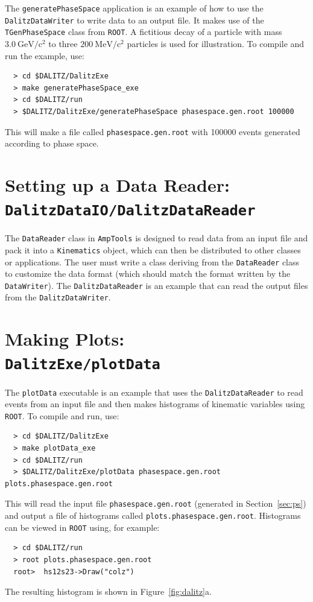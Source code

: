 \documentclass[11pt]{article}
\newcommand{\gevcc}{\mathrm{GeV/c^2}}
\newcommand{\mevcc}{\mathrm{MeV/c^2}}
\begin{document}
The {\tt generatePhaseSpace} application is an example of how to use the {\tt DalitzDataWriter} to write data to an output file.  It makes use of the {\tt TGenPhaseSpace} class from {\tt ROOT}.  A fictitious decay of a particle with mass $3.0~\gevcc$ to three $200~\mevcc$ particles is used for illustration.  To compile and run the example, use:
\begin{verbatim}
  > cd $DALITZ/DalitzExe
  > make generatePhaseSpace_exe
  > cd $DALITZ/run
  > $DALITZ/DalitzExe/generatePhaseSpace phasespace.gen.root 100000
\end{verbatim}
This will make a file called {\tt phasespace.gen.root} with 100000 events generated according to phase space.

\section{Setting up a Data Reader: \\
{\tt DalitzDataIO/DalitzDataReader}}
\label{sec:dr}

The {\tt DataReader} class in {\tt AmpTools} is designed to read data from an input file and pack it into a {\tt Kinematics} object, which can then be distributed to other classes or applications.  The user must write a class deriving from the {\tt DataReader} class to customize the data format (which should match the format written by the {\tt DataWriter}).  The {\tt DalitzDataReader} is an example that can read the output files from the {\tt DalitzDataWriter}.

\section{Making Plots: \\
{\tt DalitzExe/plotData}}
\label{sec:plot}

The {\tt plotData} executable is an example that uses the {\tt DalitzDataReader} to read events from an input file and then makes histograms of kinematic variables using {\tt ROOT}.  To compile and run, use:
\begin{verbatim}
  > cd $DALITZ/DalitzExe
  > make plotData_exe
  > cd $DALITZ/run
  > $DALITZ/DalitzExe/plotData phasespace.gen.root plots.phasespace.gen.root
\end{verbatim}
This will read the input file {\tt phasespace.gen.root} (generated in Section~\ref{sec:ps}) and output a file of histograms called {\tt plots.phasespace.gen.root}.  Histograms can be viewed in {\tt ROOT} using, for example:
\begin{verbatim}
  > cd $DALITZ/run
  > root plots.phasespace.gen.root
  root>  hs12s23->Draw("colz")
\end{verbatim}
The resulting histogram is shown in Figure~\ref{fig:dalitz}a.
\end{document}
